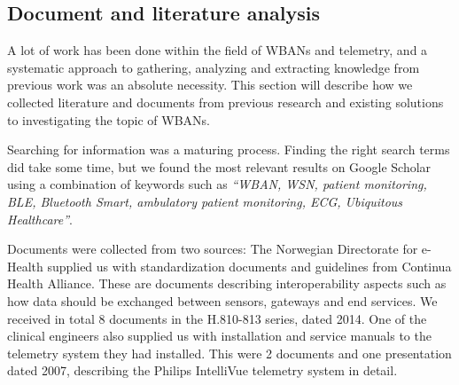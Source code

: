 

\subsection{Document and literature analysis} %
\label{sub:document_and_literature_analysis}

A lot of work has been done within the field of WBANs and telemetry, and a systematic approach to gathering, analyzing and extracting knowledge from previous work was an absolute necessity. This section will describe how we collected literature and documents from previous research and existing solutions to investigating the topic of WBANs.

Searching for information was a maturing process. Finding the right search terms did take some time, but we found the most relevant results on Google Scholar using a combination of keywords such as \textit{``WBAN, WSN, patient monitoring, BLE, Bluetooth Smart, ambulatory patient monitoring, ECG, Ubiquitous Healthcare''}.

Documents were collected from two sources: The Norwegian Directorate for e-Health supplied us with standardization documents and guidelines from Continua Health Alliance. These are documents describing interoperability aspects such as how data should be exchanged between sensors, gateways and end services. We received in total 8 documents in the H.810-813 series, dated 2014. One of the clinical engineers also supplied us with installation and service manuals to the telemetry system they had installed. This were 2 documents and one presentation dated 2007, describing the Philips IntelliVue telemetry system in detail.



